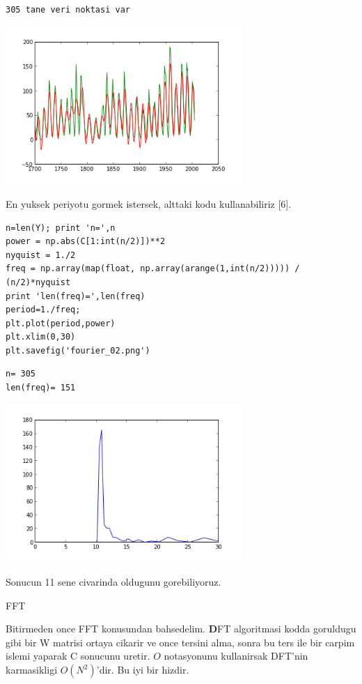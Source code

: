\documentclass[12pt,fleqn]{article}\usepackage{../common}
\begin{document}
\begin{verbatim}
305 tane veri noktasi var
\end{verbatim}
\includegraphics[height=6cm]{fourier_1.png}

En yuksek periyotu gormek istersek, alttaki kodu kullanabiliriz [6].

\begin{verbatim}
n=len(Y); print 'n=',n
power = np.abs(C[1:int(n/2)])**2
nyquist = 1./2
freq = np.array(map(float, np.array(arange(1,int(n/2))))) / (n/2)*nyquist
print 'len(freq)=',len(freq)
period=1./freq;
plt.plot(period,power)
plt.xlim(0,30)
plt.savefig('fourier_02.png')
\end{verbatim}

\begin{verbatim}
n= 305
len(freq)= 151
\end{verbatim}
\includegraphics[height=6cm]{fourier_02.png}


Sonucun 11 sene civarinda oldugunu gorebiliyoruz. 

FFT

Bitirmeden once FFT konusundan bahsedelim. $\textbf{D}$FT algoritmasi
kodda goruldugu gibi bir W matrisi ortaya cikarir ve once tersini
alma, sonra bu ters ile bir carpim islemi yaparak C sonucunu
uretir. $O$ notasyonunu kullanirsak DFT'nin karmasikligi
$O(N^2)$'dir. Bu iyi bir hizdir.
\end{document}
